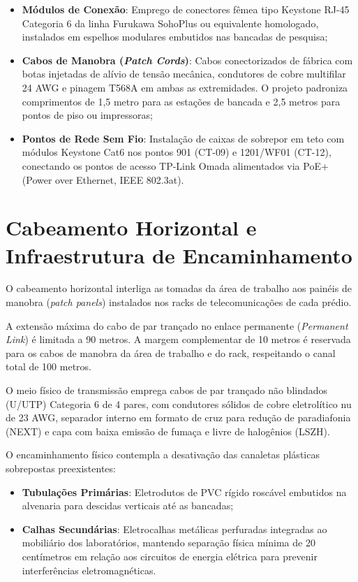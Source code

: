 \begin{itemize}
    \item \textbf{Módulos de Conexão}: Emprego de conectores fêmea tipo Keystone RJ-45 Categoria 6 da linha Furukawa SohoPlus ou equivalente homologado, instalados em espelhos modulares embutidos nas bancadas de pesquisa;
    \item \textbf{Cabos de Manobra (\textit{Patch Cords})}: Cabos conectorizados de fábrica com botas injetadas de alívio de tensão mecânica, condutores de cobre multifilar 24 AWG e pinagem T568A em ambas as extremidades. O projeto padroniza comprimentos de 1,5 metro para as estações de bancada e 2,5 metros para pontos de piso ou impressoras;
    \item \textbf{Pontos de Rede Sem Fio}: Instalação de caixas de sobrepor em teto com módulos Keystone Cat6 nos pontos 901 (CT-09) e 1201/WF01 (CT-12), conectando os pontos de acesso TP-Link Omada alimentados via PoE+ (Power over Ethernet, IEEE 802.3at).
\end{itemize}

\section{Cabeamento Horizontal e Infraestrutura de Encaminhamento}

O cabeamento horizontal interliga as tomadas da área de trabalho aos painéis de manobra (\textit{patch panels}) instalados nos racks de telecomunicações de cada prédio.

A extensão máxima do cabo de par trançado no enlace permanente (\textit{Permanent Link}) é limitada a 90 metros. A margem complementar de 10 metros é reservada para os cabos de manobra da área de trabalho e do rack, respeitando o canal total de 100 metros.

O meio físico de transmissão emprega cabos de par trançado não blindados (U/UTP) Categoria 6 de 4 pares, com condutores sólidos de cobre eletrolítico nu de 23 AWG, separador interno em formato de cruz para redução de paradiafonia (NEXT) e capa com baixa emissão de fumaça e livre de halogênios (LSZH).

O encaminhamento físico contempla a desativação das canaletas plásticas sobrepostas preexistentes:
\begin{itemize}
    \item \textbf{Tubulações Primárias}: Eletrodutos de PVC rígido roscável embutidos na alvenaria para descidas verticais até as bancadas;
    \item \textbf{Calhas Secundárias}: Eletrocalhas metálicas perfuradas integradas ao mobiliário dos laboratórios, mantendo separação física mínima de 20 centímetros em relação aos circuitos de energia elétrica para prevenir interferências eletromagnéticas.
\end{itemize}

